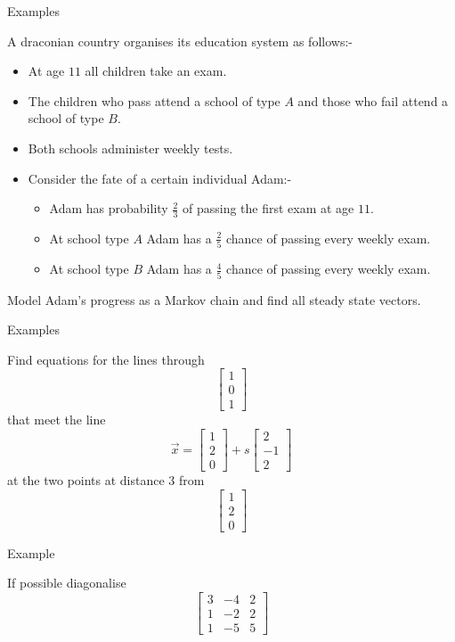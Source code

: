 \documentclass{beamer}
\begin{document}
\begin{frame}{Examples}
\begin{example}
	A draconian country organises its education system as follows:-
	\begin{itemize}
		\item At age $11$ all children take an exam.
		\item The children who pass attend a school of type $A$ and those who fail attend a school of type $B$.
		\item Both schools administer weekly tests.
		\item Consider the fate of a certain individual Adam:-
		\begin{itemize}
			\item Adam has probability $\frac{2}{3}$ of passing the first exam at age $11$.
			\item At school type $A$ Adam has a $\frac{2}{5}$ chance of passing every weekly exam.
			\item At school type $B$ Adam has a $\frac{4}{5}$ chance of passing every weekly exam.
		\end{itemize}
	\end{itemize}
	Model Adam's progress as a Markov chain and find all steady state vectors.
\end{example}
\end{frame}

\begin{frame}{Examples}
\begin{example}
	Find equations for the lines through
	\begin{equation*}
	\left[
	\begin{matrix}
	1\\
	0\\
	1
	\end{matrix}
	\right]
	\end{equation*}
	that meet the line
	\begin{equation*}
	\vec{x} = \left[
	\begin{matrix}
	1\\
	2\\
	0
	\end{matrix}
	\right]+s \left[
	\begin{matrix}
	2\\
	-1\\
	2
	\end{matrix}
	\right]
	\end{equation*}
	at the two points at distance $3$ from 
	\begin{equation*}
	\left[
	\begin{matrix}
	1\\
	2\\
	0
	\end{matrix}
	\right]
	\end{equation*}
\end{example}
\end{frame}

\begin{frame}{Example}
\begin{example}
If possible diagonalise
\[
\left[
\begin{matrix}
3&-4&2\\
1&-2&2\\
1&-5&5
\end{matrix}
\right]\]
\end{example}

\end{frame}
\end{document}
